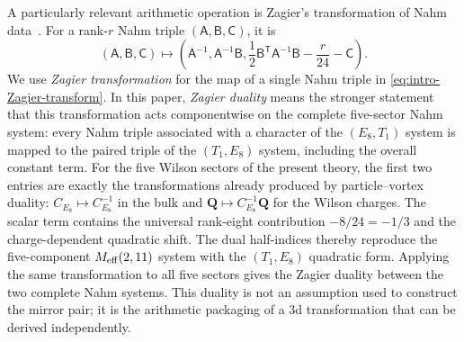 \documentclass[11pt,a4paper]{article}
\numberwithin{equation}{section}
\begin{document}
A particularly relevant arithmetic operation is Zagier's transformation of Nahm data~\cite{Zagier:2007dilogarithm}.  For a rank-$r$ Nahm triple $(\mathsf A,\mathsf B,\mathsf C)$, it is
\begin{equation}
  (\mathsf A,\mathsf B,\mathsf C)
  \longmapsto
  \left(
    \mathsf A^{-1},
    \mathsf A^{-1}\mathsf B,
    \frac12\mathsf B^{\mathsf T}\mathsf A^{-1}\mathsf B
    -\frac{r}{24}-\mathsf C
  \right).
  \label{eq:intro-Zagier-transform}
\end{equation}
We use \emph{Zagier transformation} for the map of a single Nahm triple in \eqref{eq:intro-Zagier-transform}.  In this paper, \emph{Zagier duality} means the stronger statement that this transformation acts componentwise on the complete five-sector Nahm system: every Nahm triple associated with a character of the $(E_8,T_1)$ system is mapped to the paired triple of the $(T_1,E_8)$ system, including the overall constant term.
For the five Wilson sectors of the present theory, the first two entries are exactly the transformations already produced by particle--vortex duality: $C_{E_8}\mapsto C_{E_8}^{-1}$ in the bulk and $\boldsymbol Q\mapsto C_{E_8}^{-1}\boldsymbol Q$ for the Wilson charges.  The scalar term contains the universal rank-eight contribution $-8/24=-1/3$ and the charge-dependent quadratic shift.  The dual half-indices thereby reproduce the five-component $M_{\rm eff}(2,11)$ system with the $(T_1,E_8)$ quadratic form.  Applying the same transformation to all five sectors gives the Zagier duality between the two complete Nahm systems.  This duality is not an assumption used to construct the mirror pair; it is the arithmetic packaging of a 3d transformation that can be derived independently.
\end{document}
